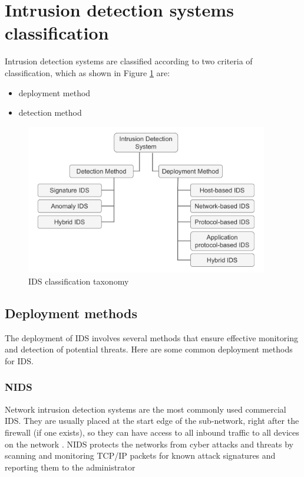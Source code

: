 \section{Intrusion detection systems classification}
Intrusion detection systems are classified according to two criteria of classification, which as shown in Figure \ref{fig:IDS-classification-taxonomy} are:

\firmlist
\begin{itemize}
	\item deployment method \cite{ids-classification}
	\item detection method \cite{ids-classification}
\end{itemize}




\begin{figure}[h]
	\centering
	\includegraphics[width=400px]{figures/IDS_classification.pdf}
	\caption{IDS classification taxonomy}
	\label{fig:IDS-classification-taxonomy}
\end{figure}



\subsection{Deployment methods}
The deployment of IDS involves several methods that ensure effective monitoring and detection of potential threats. Here are some common deployment methods for IDS.

\subsubsection{NIDS}
Network intrusion detection systems are the most commonly used commercial IDS. They are usually placed at the start edge of the sub-network, right after the firewall (if one exists), so they can have access to all inbound traffic to all devices on the network \cite{NIST-IDS}. NIDS protects the networks from cyber attacks and threats by scanning and monitoring TCP/IP packets for known attack signatures and reporting them to the administrator \cite{NIDS-ip-tcp}

